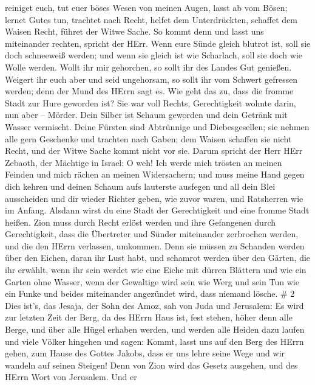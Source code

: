 reiniget euch, tut euer böses Wesen von meinen Augen, lasst ab vom
Bösen;  lernet Gutes tun, trachtet nach Recht, helfet dem
Unterdrückten, schaffet dem Waisen Recht, führet der Witwe Sache.
 So kommt denn und lasst uns miteinander rechten, spricht
der HErr. Wenn eure Sünde gleich blutrot ist, soll sie doch schneeweiß
werden; und wenn sie gleich ist wie Scharlach, soll sie doch wie Wolle
werden.  Wollt ihr mir gehorchen, so sollt ihr des Landes
Gut genießen.  Weigert ihr euch aber und seid ungehorsam,
so sollt ihr vom Schwert gefressen werden; denn der Mund des HErrn sagt
es.  Wie geht das zu, dass die fromme Stadt zur Hure
geworden ist? Sie war voll Rechts, Gerechtigkeit wohnte darin, nun aber
-- Mörder.  Dein Silber ist Schaum geworden und dein
Getränk mit Wasser vermischt.  Deine Fürsten sind
Abtrünnige und Diebesgesellen; sie nehmen alle gern Geschenke und
trachten nach Gaben; dem Waisen schaffen sie nicht Recht, und der Witwe
Sache kommt nicht vor sie.  Darum spricht der Herr HErr
Zebaoth, der Mächtige in Israel: O weh! Ich werde mich trösten an meinen
Feinden und mich rächen an meinen Widersachern;  und muss
meine Hand gegen dich kehren und deinen Schaum aufs lauterste ausfegen
und all dein Blei ausscheiden  und dir wieder Richter
geben, wie zuvor waren, und Ratsherren wie im Anfang. Alsdann wirst du
eine Stadt der Gerechtigkeit und eine fromme Stadt heißen. 
Zion muss durch Recht erlöst werden und ihre Gefangenen durch
Gerechtigkeit,  dass die Übertreter und Sünder miteinander
zerbrochen werden, und die den HErrn verlassen, umkommen. 
Denn sie müssen zu Schanden werden über den Eichen, daran ihr Lust habt,
und schamrot werden über den Gärten, die ihr erwählt,  wenn
ihr sein werdet wie eine Eiche mit dürren Blättern und wie ein Garten
ohne Wasser,  wenn der Gewaltige wird sein wie Werg und
sein Tun wie ein Funke und beides miteinander angezündet wird, dass
niemand lösche. \# 2  Dies ist's, das Jesaja, der Sohn des
Amoz, sah von Juda und Jerusalem:  Es wird zur letzten Zeit
der Berg, da des HErrn Haus ist, fest stehen, höher denn alle Berge, und
über alle Hügel erhaben werden, und werden alle Heiden dazu laufen
 und viele Völker hingehen und sagen: Kommt, lasst uns auf
den Berg des HErrn gehen, zum Hause des Gottes Jakobs, dass er uns lehre
seine Wege und wir wandeln auf seinen Steigen! Denn von Zion wird das
Gesetz ausgehen, und des HErrn Wort von Jerusalem.  Und er
